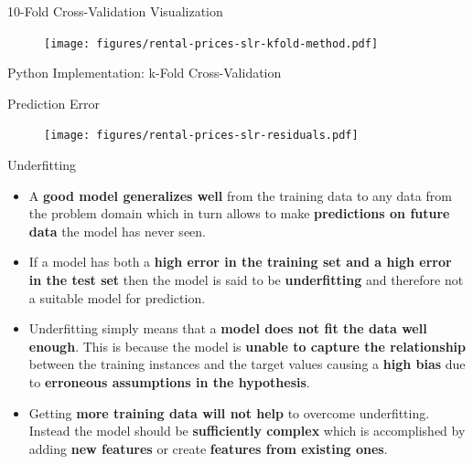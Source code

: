 \documentclass[main.tex]{subfiles}
\begin{document}
    \begin{frame}{10-Fold Cross-Validation Visualization}
        \begin{figure}
            \label{fig:rental-prices-slr-kfold}
            \texttt{[image: figures/rental-prices-slr-kfold-method.pdf]}
        \end{figure}
    \end{frame}

    \begin{frame}{Python Implementation: k-Fold Cross-Validation}
        
    \end{frame}

    \begin{frame}{Prediction Error}
        \begin{figure}
            \label{fig:rental-prices-slr-residuals}
            \texttt{[image: figures/rental-prices-slr-residuals.pdf]}
        \end{figure}
    \end{frame}

    \begin{frame}{Underfitting}
		\begin{itemize}
            \item A \textbf{good model generalizes well} from the training data to any data from the problem domain which in turn allows to make \textbf{predictions on future data} the model has never seen.
            \item If a model has both a \textbf{high error in the training set and a high error in the test set} then the model is said to be \textbf{underfitting} and therefore not a suitable model for prediction.
            \item Underfitting simply means that a \textbf{model does not fit the data well enough}. This is because the model is \textbf{unable to capture the relationship} between the training instances and the target values causing a \textbf{high bias} due to \textbf{erroneous assumptions in the hypothesis}.
            \item Getting \textbf{more training data will not help} to overcome underfitting. Instead the model should be \textbf{sufficiently complex} which is accomplished by adding \textbf{new features} or create \textbf{features from existing ones}.
        \end{itemize}
    \end{frame}
    
\end{document}
